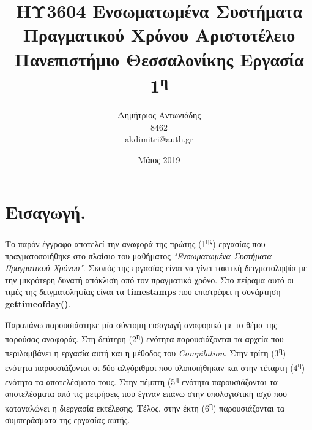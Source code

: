 \documentclass[12pt, a4paper]{article}
\title{{ΗΥ3604 Ενσωματωμένα Συστήματα Πραγματικού Χρόνου}\newline
{\large Αριστοτέλειο Πανεπιστήμιο Θεσσαλονίκης}\newline
{Εργασία 1\textsuperscript{η}}}
\author{Δημήτριος Αντωνιάδης\\
8462
\\\textlatin{akdimitri@auth.gr}}
\date{Μάιος 2019}
\begin{document}
\maketitle
\pagebreak
\tableofcontents
\pagebreak
\section{Εισαγωγή.}
\justify
Το παρόν έγγραφο αποτελεί την αναφορά της πρώτης (1\textsuperscript{ης}) εργασίας που πραγματοποιήθηκε στο πλαίσιο του μαθήματος \textit{"Ενσωματωμένα Συστήματα Πραγματικού Χρόνου"}. Σκοπός της εργασίας είναι να γίνει τακτική δειγματοληψία με την μικρότερη δυνατή απόκλιση από τον
πραγματικό χρόνο. Στο πείραμα αυτό οι τιμές της δειγματοληψίας είναι τα \textlatin{\textbf{timestamps}} που επιστρέφει η συνάρτηση \textlatin{\textbf{gettimeofday()}}\cite{manual}.

\justify
Παραπάνω παρουσιάστηκε μία σύντομη εισαγωγή αναφορικά με το θέμα της παρούσας αναφοράς. Στη δεύτερη (2\textsuperscript{η}) ενότητα παρουσιάζονται τα αρχεία που περιλαμβάνει η εργασία αυτή και η μέθοδος του \textit{\textlatin{Compilation}}. Στην τρίτη (3\textsuperscript{η}) ενότητα παρουσιάζονται οι δύο αλγόριθμοι που υλοποιήθηκαν και στην τέταρτη (4\textsuperscript{η}) ενότητα τα αποτελέσματα τους. Στην πέμπτη (5\textsuperscript{η} ενότητα παρουσιάζονται τα αποτελέσματα από τις μετρήσεις που έγιναν επάνω στην υπολογιστική ισχύ που καταναλώνει η διεργασία εκτέλεσης. Τέλος, στην έκτη (6\textsuperscript{η}) παρουσιάζονται τα συμπεράσματα της εργασίας αυτής.


\end{document}
